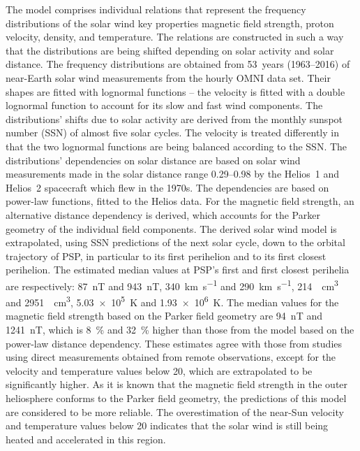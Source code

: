 The model comprises individual relations that represent the frequency distributions of the solar wind key properties magnetic field strength, proton velocity, density, and temperature. The relations are constructed in such a way that the distributions are being shifted depending on solar activity and solar distance. The frequency distributions are obtained from 53~years (1963--2016) of near-Earth solar wind measurements from the hourly OMNI data set. Their shapes are fitted with lognormal functions -- the velocity is fitted with a double lognormal function to account for its slow and fast wind components. The distributions' shifts due to solar activity are derived from the monthly sunspot number (SSN) of almost five solar cycles. The velocity is treated differently in that the two lognormal functions are being balanced according to the SSN. The distributions' dependencies on solar distance are based on solar wind measurements made in the solar distance range \SIrange{0.29}{0.98}{\au} by the Helios~1 and Helios~2 spacecraft which flew in the 1970s. The dependencies are based on power-law functions, fitted to the Helios data. For the magnetic field strength, an alternative distance dependency is derived, which accounts for the Parker geometry of the individual field components. The derived solar wind model is extrapolated, using SSN predictions of the next solar cycle, down to the orbital trajectory of PSP, in particular to its first perihelion and to its first closest perihelion.
The estimated median values at PSP's first and first closest perihelia are respectively: \SI{87}{\nano\tesla} and \SI{943}{\nano\tesla}, \SI{340}{\km\per\s} and \SI{290}{\km\per\s}, \SI{214}{\per\cm\cubed} and \SI{2951}{\per\cm\cubed}, \SI{5.03e5}{\kelvin} and \SI{1.93e6}{\kelvin}. The median values for the magnetic field strength based on the Parker field geometry are \SI{94}{\nano\tesla} and \SI{1241}{\nano\tesla}, which is \SI{8}{\%} and \SI{32}{\%} higher than those from the model based on the power-law distance dependency. These estimates agree with those from studies using direct measurements obtained from remote observations, except for the velocity and temperature values below \SI{20}{\Rs}, which are extrapolated to be significantly higher.
As it is known that the magnetic field strength in the outer heliosphere conforms to the Parker field geometry, the predictions of this model are considered to be more reliable. The overestimation of the near-Sun velocity and temperature values below \SI{20}{\Rs} indicates that the solar wind is still being heated and accelerated in this region.



\newpage

{}
{\let\cleardoublepage\clearpage\tableofcontents}	%
\label{sec:toc}
\cleardoublepage

